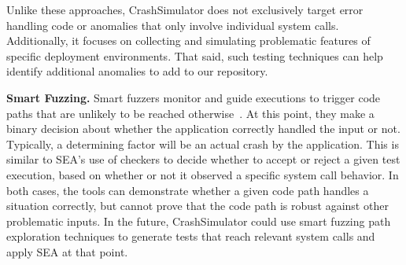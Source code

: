 Unlike these approaches, CrashSimulator does not exclusively target error
handling code or anomalies that only involve individual system calls.
Additionally, it focuses on collecting and simulating
problematic features of specific
deployment environments.
That said, such testing techniques
can help identify additional anomalies  to add to our repository.

{\bf Smart Fuzzing.}
Smart fuzzers monitor and guide executions to
trigger code paths that are unlikely to be reached
otherwise~\cite{smartfuzzing, taintbasedfuzzing}.
At this point, they make a binary decision about
whether the application correctly handled the input or not.
Typically, a determining factor will be an actual crash by the application.
This is similar to SEA's use of checkers to decide whether
to accept or reject a given test
execution, based on whether or not it observed a specific system call behavior.
In both cases, the tools can demonstrate whether a given code path handles a
situation correctly, but cannot prove that the code path is robust against
other problematic inputs.  In the future, CrashSimulator could use smart
fuzzing path exploration techniques to generate tests that reach relevant
system calls and apply SEA at that point.

%

